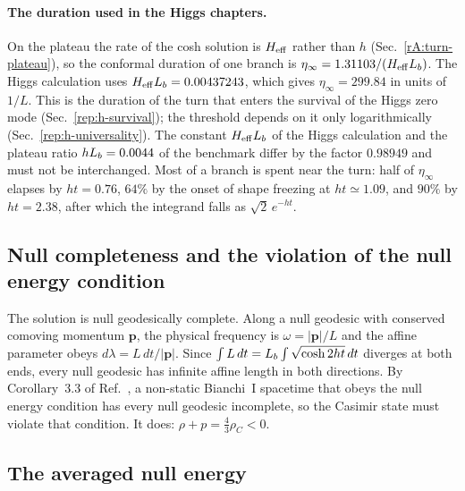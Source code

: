 \paragraph{The duration used in the Higgs chapters.}
On the plateau the rate of the cosh solution is $H_{\mathrm{eff}}$ rather than $h$ (Sec.~\ref{rA:turn-plateau}), so the conformal duration of one branch is $\eta_\infty=1.31103/(H_{\mathrm{eff}}L_b)$.
The Higgs calculation uses $H_{\mathrm{eff}}L_b=0.00437243$, which gives $\eta_\infty=299.84$ in units of $1/L$. %
This is the duration of the turn that enters the survival of the Higgs zero mode (Sec.~\ref{rep:h-survival}); the threshold depends on it only logarithmically (Sec.~\ref{rep:h-universality}).
The constant $H_{\mathrm{eff}}L_b$ of the Higgs calculation and the plateau ratio $hL_b=0.0044$ of the benchmark differ by the factor $0.98949$ and must not be interchanged. %
Most of a branch is spent near the turn: half of $\eta_\infty$ elapses by $ht=0.76$, $64\%$ by the onset of shape freezing at $ht\simeq1.09$, and $90\%$ by $ht=2.38$, after which the integrand falls as $\sqrt2\,e^{-ht}$. %

\subsection{Null completeness and the violation of the null energy condition}
\label{rA:turn-complete}

The solution is null geodesically complete.
Along a null geodesic with conserved comoving momentum $\bm p$, the physical frequency is $\omega=|\bm p|/L$ and the affine parameter obeys $d\lambda=L\,dt/|\bm p|$.
Since $\int L\,dt=L_b\int\sqrt{\cosh2ht}\,dt$ diverges at both ends, every null geodesic has infinite affine length in both directions.
By Corollary~3.3 of Ref.~\cite{Zhou:2026szo}, a non-static Bianchi~I spacetime that obeys the null energy condition has every null geodesic incomplete, so the Casimir state must violate that condition.
It does: $\rho+p=\tfrac43\rho_C<0$.

\subsection{The averaged null energy}
\label{rA:turn-anec}

